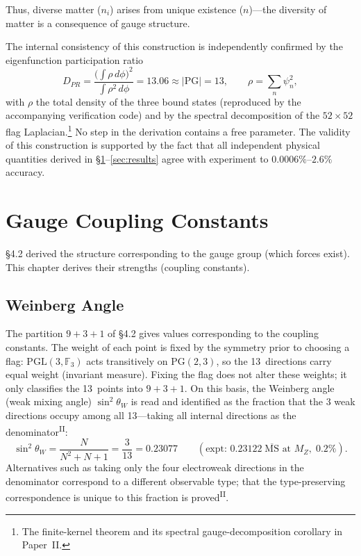 \documentclass[12pt,a4paper]{article}
\newcommand{\PII}{\textsuperscript{\textup{II}}}
\begin{document}
Thus, diverse matter ($n_i$) arises from unique existence ($n$)---the diversity of matter is a consequence of gauge structure.

The internal consistency of this construction is independently confirmed by the eigenfunction participation ratio
\begin{equation}
  D_{PR} = \frac{\bigl(\int\rho\,d\phi\bigr)^2}{\int\rho^2\,d\phi} = 13.06 \approx |\mathrm{PG}| = 13,\qquad \rho = \sum_n \psi_n^2,
\end{equation}
with $\rho$ the total density of the three bound states (reproduced by the accompanying verification code) and by the spectral decomposition of the $52 \times 52$ flag Laplacian.\footnote{The finite-kernel theorem and its spectral gauge-decomposition corollary in Paper~II.}
No step in the derivation contains a free parameter.
The validity of this construction is supported by the fact that
all independent physical quantities derived in \S\ref{sec:couplings}--\ref{sec:results}
agree with experiment to $0.0006\%$--$2.6\%$ accuracy.

\section{Gauge Coupling Constants}\label{sec:couplings}

\S4.2 derived the structure corresponding to the gauge group
(which forces exist). This chapter derives their strengths
(coupling constants).

\subsection{Weinberg Angle}\label{sec:weinberg}

The partition $9{+}3{+}1$ of \S4.2 gives values corresponding
to the coupling constants.
The weight of each point is fixed by the symmetry prior to choosing
a flag: $\mathrm{PGL}(3,\mathbb{F}_3)$ acts transitively on
$\mathrm{PG}(2,3)$, so the 13~directions carry equal weight
(invariant measure). Fixing the flag does not alter these weights;
it only classifies the 13~points into $9{+}3{+}1$.
On this basis, the Weinberg angle~\cite{weinberg} (weak mixing angle)
$\sin^2\!\theta_W$ is read and identified as the fraction that the 3
weak directions occupy among all 13---taking all internal directions
as the denominator\PII{}:
\begin{equation}\label{eq:weinberg}
  \sin^2\!\theta_W = \frac{N}{N^2{+}N{+}1} = \frac{3}{13} = 0.23077
  \qquad (\text{expt: } 0.23122\;\overline{\mathrm{MS}}\text{ at }M_Z,\; 0.2\%).
\end{equation}
Alternatives such as taking only the four electroweak directions in the denominator correspond to a different observable type; that the type-preserving correspondence is unique to this fraction is proved\PII{}.
\end{document}
